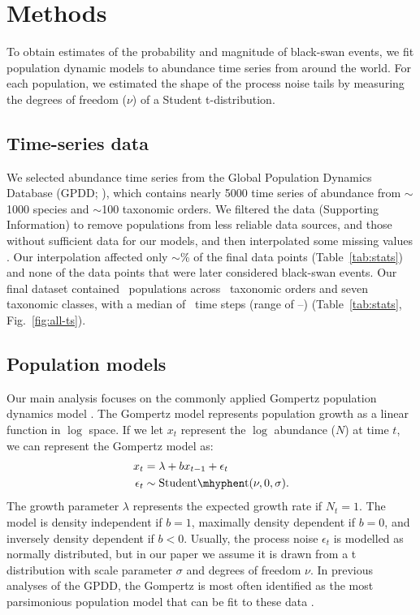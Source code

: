 \section{Methods}

To obtain estimates of the probability and magnitude of black-swan events, we fit population dynamic models to abundance time series from around the world. For each population, we estimated the shape of the process noise tails by measuring the degrees of freedom ($\nu$) of a Student t-distribution.

\subsection{Time-series data}

We selected abundance time series from the Global Population Dynamics Database (GPDD; \citeauthor{gpdd2010} \citeyear{gpdd2010}), which contains nearly 5000 time series of abundance from $\sim$1000 species and $\sim$100 taxonomic orders. We filtered the data (Supporting Information) to remove populations from less reliable data sources, and those without sufficient data for our models, and then interpolated some missing values \citep[\textit{sensu}][]{brook2006a}. Our interpolation affected only $\sim$\interpPointsPerc \% of the final data points (Table~\ref{tab:stats}) and none of the data points that were later considered black-swan events. Our final dataset contained \NPops~populations across \NOrders~taxonomic orders and seven taxonomic classes, with a median of \medianTimeSteps~time steps (range of \minTimeSteps--\maxTimeSteps) (Table~\ref{tab:stats}, Fig.~\ref{fig:all-ts}).

\subsection{Population models}

Our main analysis focuses on the commonly applied Gompertz population dynamics model \citep[e.g.][]{knape2012,dennis2014,connors2014}. The Gompertz model represents population growth as a linear function in $\log$ space. If we let $x_t$ represent the $\log$ abundance ($N$) at time $t$, we can represent the Gompertz model as:
\begin{align*}
x_t &= \lambda + b x_{t-1} + \epsilon_t\\
\epsilon_t &\sim \mathrm{Student\mhyphen t}(\nu, 0, \sigma).
\end{align*}
The growth parameter $\lambda$ represents the expected growth rate if $N_t = 1$. The model is density independent if $b = 1$, maximally density dependent if $b = 0$, and inversely density dependent if $b < 0$. Usually, the process noise $\epsilon_t$ is modelled as normally distributed, but in our paper we assume it is drawn from a t distribution with scale parameter $\sigma$ and degrees of freedom $\nu$. In previous analyses of the GPDD, the Gompertz is most often identified as the most parsimonious population model that can be fit to these data \citep{brook2006}.

